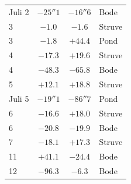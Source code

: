 \begin{center}
\begin{tabular}{l|c|c|l}
Juli 2  &  $-25''1$  &  $-16''6$  &  Bode  \\
3  &  $-1.0$  &  $-1.6$  &  Struve  \\
3  &  $-1.8$  &  $+44.4$  &  Pond  \\
4  &  $-17.3$  &  $+19.6$  &  Struve  \\
4  &  $-48.3$  &  $-65.8$  &  Bode  \\
5  &  $+12.1$  &  $+18.8$  &  Struve  \\
\hline
 Juli 5  &  $-19''1$  &  $-86''7$  &  Pond  \\
 6  &  $-16.6$  &  $+18.0$  &  Struve  \\
 6  &  $-20.8$  &  $-19.9$  &  Bode  \\
 7  &  $-18.1$  &  $+17.3$  &  Struve  \\
 11  &  $+41.1$  &  $-24.4$  &  Bode  \\
 12  &  $-96.3$  &  $-6.3$  &  Bode  \\
\end{tabular}
\end{center}

